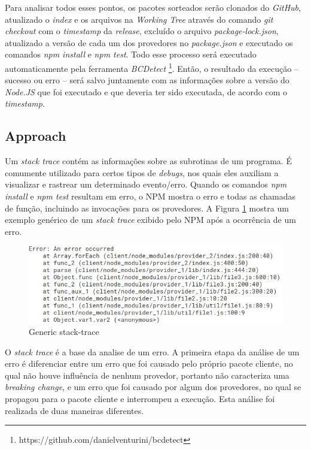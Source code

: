 Para analisar todos esses pontos, os pacotes sorteados serão clonados do \textit{GitHub}, atualizado o \textit{index} e os arquivos na \textit{Working Tree} através do comando \textit{git checkout} com o \textit{timestamp} da \textit{release}, excluído o arquivo \textit{package-lock.json}, atualizado a versão de cada um dos provedores no \textit{package.json} e executado os comandos \textit{npm install} e \textit{npm test}. Todo esse processo será executado automaticamente pela ferramenta \textit{BCDetect} \footnote{https://github.com/danielventurini/bcdetect}. Então, o resultado da execução -- sucesso ou erro -- será salvo juntamente com as informações sobre a versão do \textit{Node.JS} que foi executado e que deveria ter sido executada, de acordo com o \textit{timestamp}. %

\subsection{Approach}
\label{apr:rq1}
Um \textit{stack trace} contém as informações sobre as subrotinas de um programa. É comumente utilizado para certos tipos de \textit{debugs}, nos quais eles auxiliam a visualizar e rastrear um determinado evento/erro. Quando os comandos \textit{npm install} e \textit{npm test} resultam em erro, o \Gls{NPM} mostra o erro e todas as chamadas de função, incluindo as invocações para os provedores. A Figura \ref{fig:trace} mostra um exemplo genérico de um \textit{stack trace} exibido pelo \Gls{NPM} após a ocorrência de um erro.

\begin{figure}
    \centering
    \includegraphics[scale=0.7]{figuras/stack_trace.jpeg}
    \caption{Generic stack-trace}
    \label{fig:trace}
\end{figure}{}

O \textit{stack trace} é a base da analise de um erro. A primeira etapa da análise de um erro é diferenciar entre um erro que foi causado pelo próprio pacote cliente, no qual não houve influência de nenhum provedor, portanto não caracteriza uma \textit{breaking change}, e um erro que foi causado por algum dos provedores, no qual se propagou para o pacote cliente e interrompeu a execução. Esta análise foi realizada de duas maneiras diferentes.

